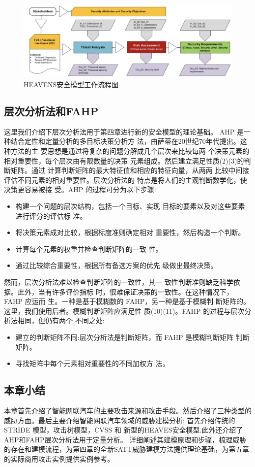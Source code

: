 \begin{figure}
    \centering
    \includegraphics[scale=0.6]{resources/img/i11.png}
    \caption{HEAVENS安全模型工作流程图}
  \end{figure}

  \subsection{层次分析法和FAHP}
  这里我们介绍下层次分析法用于第四章进行新的安全模型的理论基础。
  AHP 是一种结合定性和定量分析的多目标决策分析方
法，由萨蒂在20世纪70年代提出\cite{saaty1990make}。这种方法的主
要思想是通过将复杂的问题分解成几个层次来比较每两
个决策元素的相对重要性，每个层次由有限数量的决策
元素组成。然后建立满足性质(2)(3)的判断矩阵。通过
计算判断矩阵的最大特征值和相应的特征向量，从两两
比较中间接评估不同元素的相对重要性。层次分析法的
特点是将人们的主观判断数学化，使决策更容易被接
受。AHP 的过程可分为以下步骤:
\begin{itemize}
  \item  构建一个问题的层次结构，包括一个目标、实现
  目标的要素以及对这些要素进行评分的评估标
  准。
  \item  将决策元素成对比较，根据标度准则确定相对
  重要性，然后构造一个判断。
  \item  计算每个元素的权重并检查判断矩阵的一致
  性。
  \item 通过比较综合重要性，根据所有备选方案的优先
  级做出最终决策。
\end{itemize}

然而，层次分析法难以检查判断矩阵的一致性，其一
致性判断准则缺乏科学依据。此外，当有许多评价指标
时，很难保证决策的一致性。在这种情况下，FAHP 应运而
生\cite{min1997fuzzy}。一种是基于模糊数的 FAHP，另一种是基于模糊判
断矩阵的。这里，我们使用后者。模糊判断矩阵应满足性
质(10)(11)。FAHP 的过程与层次分析法相同，但仍有两个
不同之处:
\begin{itemize}
  \item  建立的判断矩阵不同:层次分析法是判断矩阵，而
  FAHP 是模糊判断矩阵
  判断矩阵。
  \item  寻找矩阵中每个元素相对重要性的不同加权方
  法。
\end{itemize}


\subsection{本章小结}
本章首先介绍了智能网联汽车的主要攻击来源和攻击手段。然后介绍了三种类型的威胁方面。最后主要介绍智能网联汽车领域的威胁建模分析:
首先介绍传统的 STRIDE 模型，攻击树模型，CVSS 和 新型的HEAVES安全模型.此外还介绍了AHP和FAHP层次分析法用于定量分析。
详细阐述其建模原理和步骤，梳理威胁
的存在和建模流程，为第四章的全新SATT威胁建模方法提供理论基础，为第五章的实际商用攻击实例提供实例参考。